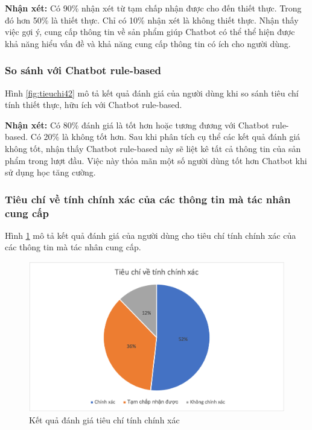 \textbf{Nhận xét:}
Có 90\% nhận xét từ tạm chấp nhận được cho đến thiết thực. Trong đó
hơn 50\% là thiết thực. Chỉ có 10\% nhận xét là không thiết thực.
Nhận thấy việc gợi ý, cung cấp thông tin về sản phẩm giúp Chatbot
có thể thể hiện được khả năng hiểu vấn đề và khả năng cung cấp
thông tin có ích cho người dùng.

\subsubsection{So sánh với Chatbot rule-based}
Hình \ref{fig:tieuchi42} mô tả kết quả đánh giá của người dùng khi
so sánh tiêu chí tính thiết thực, hữu ích với Chatbot rule-based.

\textbf{Nhận xét:}
Có 80\% đánh giá là tốt hơn hoặc tương đương với Chatbot rule-based.
Có 20\% là không tốt hơn. Sau khi phân tích cụ thể các kết quả
đánh giá không tốt, nhận thấy Chatbot rule-based này sẽ liệt kê tất cả
thông tin của sản phẩm trong lượt đầu. Việc này thỏa mãn một số
người dùng tốt hơn Chatbot khi sử dụng học tăng cường.

\subsubsection{Tiêu chí về tính chính xác của các thông tin mà
tác nhân cung cấp}
Hình \ref{fig:tieuchi5} mô tả kết quả đánh giá của người dùng cho
tiêu chí tính chính xác của các thông tin mà tác nhân cung cấp.

\begin{figure}[ht!]
    \centering
    \includegraphics[scale=0.91]{thesis/chatbot/ketqua/img/tieuchi5.png}
    \caption{Kết quả đánh giá tiêu chí tính chính xác}
    \label{fig:tieuchi5}
\end{figure}

